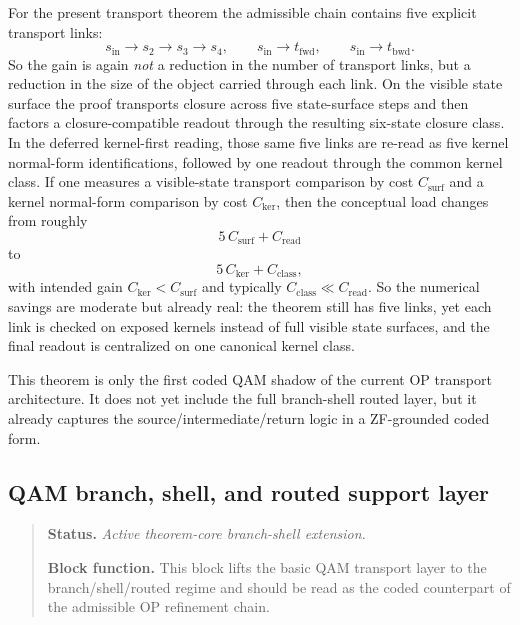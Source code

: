 \begin{remark}\label{rem:qam-kernel-first-transport-savings}
For the present transport theorem the admissible chain contains five explicit transport links:
\[
s_{\mathrm{in}}\to s_2\to s_3\to s_4,
\qquad
s_{\mathrm{in}}\to t_{\mathrm{fwd}},
\qquad
s_{\mathrm{in}}\to t_{\mathrm{bwd}}.
\]
So the gain is again \emph{not} a reduction in the number of transport links, but a reduction in the size of the object carried through each link. On the visible state surface the proof transports closure across five state-surface steps and then factors a closure-compatible readout through the resulting six-state closure class. In the deferred kernel-first reading, those same five links are re-read as five kernel normal-form identifications, followed by one readout through the common kernel class. If one measures a visible-state transport comparison by cost $C_{\mathrm{surf}}$ and a kernel normal-form comparison by cost $C_{\mathrm{ker}}$, then the conceptual load changes from roughly
\[
5\,C_{\mathrm{surf}} + C_{\mathrm{read}}
\]
to
\[
5\,C_{\mathrm{ker}} + C_{\mathrm{class}},
\]
with intended gain $C_{\mathrm{ker}}<C_{\mathrm{surf}}$ and typically $C_{\mathrm{class}}\ll C_{\mathrm{read}}$. So the numerical savings are moderate but already real: the theorem still has five links, yet each link is checked on exposed kernels instead of full visible state surfaces, and the final readout is centralized on one canonical kernel class.
\end{remark}

\begin{remark}
This theorem is only the first coded QAM shadow of the current OP transport architecture. It does not yet include the full branch-shell routed layer, but it already captures the source/intermediate/return logic in a ZF-grounded coded form.
\end{remark}



\subsection*{QAM branch, shell, and routed support layer}
\begin{quote}\small
\noindent\textbf{Status.} \emph{Active theorem-core branch-shell extension.}\par
\noindent\textbf{Block function.} This block lifts the basic QAM transport layer to the branch/shell/routed regime and should be read as the coded counterpart of the admissible OP refinement chain.
\end{quote}

